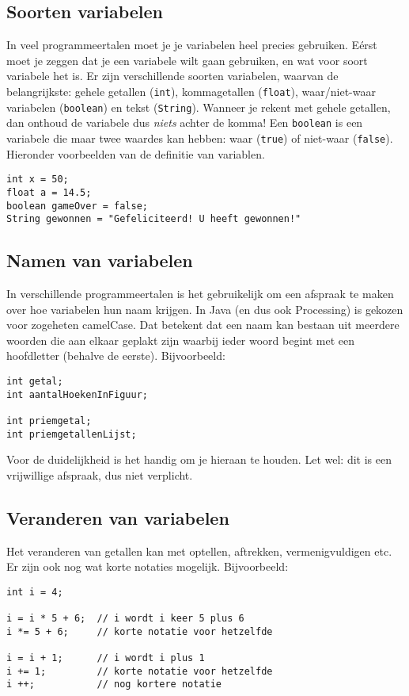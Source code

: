 \documentclass[a4paper,11pt]{report}
\begin{document}
\subsection{Soorten variabelen}

In veel programmeertalen moet je je variabelen heel precies gebruiken.
Eérst moet je zeggen dat je een variabele wilt gaan gebruiken, en wat voor
soort variabele het is.  Er zijn verschillende soorten variabelen, waarvan
de belangrijkste: gehele getallen (\verb|int|), kommagetallen
(\verb|float|), waar/niet-waar variabelen (\verb|boolean|) en tekst
(\verb|String|).  Wanneer je rekent met gehele getallen, dan onthoud de
variabele dus \emph{niets} achter de komma!  Een \verb|boolean| is een
variabele die maar twee waardes kan hebben: waar (\verb|true|) of
niet-waar (\verb|false|).  Hieronder voorbeelden van de definitie van
variablen.
\begin{verbatim}
int x = 50;
float a = 14.5;
boolean gameOver = false;
String gewonnen = "Gefeliciteerd! U heeft gewonnen!"
\end{verbatim}


\subsection{Namen van variabelen}

In verschillende programmeertalen is het gebruikelijk om een afspraak te maken over hoe variabelen hun naam krijgen.  In Java (en dus ook Processing) is gekozen voor zogeheten camelCase.  Dat betekent dat een naam kan bestaan uit meerdere woorden die aan elkaar geplakt zijn waarbij ieder woord begint met een hoofdletter (behalve de eerste).  Bijvoorbeeld:
\begin{verbatim}
int getal;
int aantalHoekenInFiguur;

int priemgetal;
int priemgetallenLijst;
\end{verbatim}
Voor de duidelijkheid is het handig om je hieraan te houden.  Let wel: dit is een vrijwillige afspraak, dus niet verplicht.


\subsection{Veranderen van variabelen}

Het veranderen van getallen kan met optellen, aftrekken, vermenigvuldigen etc.  Er zijn ook nog wat korte notaties mogelijk.  Bijvoorbeeld:

\begin{verbatim}
int i = 4;

i = i * 5 + 6;  // i wordt i keer 5 plus 6
i *= 5 + 6;     // korte notatie voor hetzelfde

i = i + 1;      // i wordt i plus 1
i += 1;         // korte notatie voor hetzelfde
i ++;           // nog kortere notatie
\end{verbatim}
\end{document}
